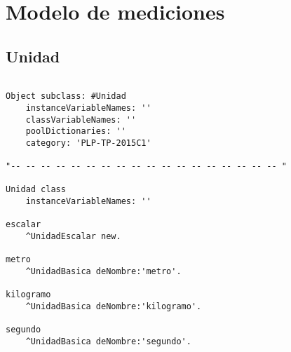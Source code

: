 \section{Modelo de mediciones}



\subsection{Unidad}

\begin{lstlisting}

Object subclass: #Unidad
	instanceVariableNames: ''
	classVariableNames: ''
	poolDictionaries: ''
	category: 'PLP-TP-2015C1'

"-- -- -- -- -- -- -- -- -- -- -- -- -- -- -- -- -- -- "

Unidad class
	instanceVariableNames: ''

escalar
	^UnidadEscalar new.

metro
	^UnidadBasica deNombre:'metro'.

kilogramo
	^UnidadBasica deNombre:'kilogramo'.

segundo
	^UnidadBasica deNombre:'segundo'.

\end{lstlisting}
\vspace{5mm}

